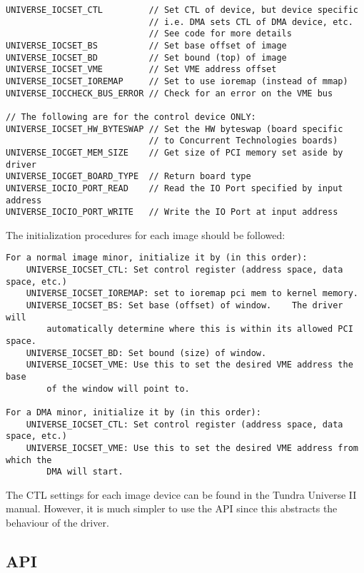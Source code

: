		\begin{lstlisting}
UNIVERSE_IOCSET_CTL         // Set CTL of device, but device specific
							// i.e. DMA sets CTL of DMA device, etc.
							// See code for more details 
UNIVERSE_IOCSET_BS			// Set base offset of image 
UNIVERSE_IOCSET_BD			// Set bound (top) of image 
UNIVERSE_IOCSET_VME         // Set VME address offset 
UNIVERSE_IOCSET_IOREMAP     // Set to use ioremap (instead of mmap) 
UNIVERSE_IOCCHECK_BUS_ERROR // Check for an error on the VME bus 

// The following are for the control device ONLY:
UNIVERSE_IOCSET_HW_BYTESWAP // Set the HW byteswap (board specific
							// to Concurrent Technologies boards) 
UNIVERSE_IOCGET_MEM_SIZE    // Get size of PCI memory set aside by driver 
UNIVERSE_IOCGET_BOARD_TYPE  // Return board type 
UNIVERSE_IOCIO_PORT_READ    // Read the IO Port specified by input address 
UNIVERSE_IOCIO_PORT_WRITE   // Write the IO Port at input address 
		\end{lstlisting}
The initialization procedures for each image should be followed:
		\begin{lstlisting}
For a normal image minor, initialize it by (in this order):
	UNIVERSE_IOCSET_CTL: Set control register (address space, data space, etc.)
	UNIVERSE_IOCSET_IOREMAP: set to ioremap pci mem to kernel memory.
	UNIVERSE_IOCSET_BS:	Set base (offset) of window.	The driver will 
        automatically determine where this is within its allowed PCI space.
	UNIVERSE_IOCSET_BD:	Set bound (size) of window.
	UNIVERSE_IOCSET_VME: Use this to set the desired VME address the base
		of the window will point to.

For a DMA minor, initialize it by (in this order):
	UNIVERSE_IOCSET_CTL: Set control register (address space, data space, etc.)
	UNIVERSE_IOCSET_VME: Use this to set the desired VME address from which the 
		DMA will start. 

		\end{lstlisting}
The CTL settings for each image device can be found in the Tundra Universe II manual.  
However, it is much simpler to use the API since this abstracts the behaviour of the
driver.



		\subsection{API}
		\label{app:DriverAPI}

